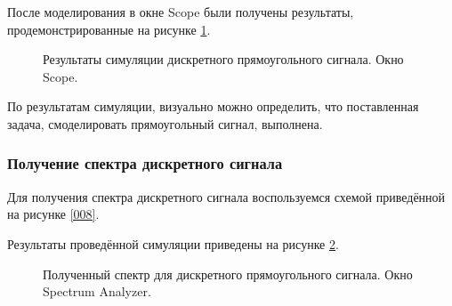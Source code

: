 \documentclass[a4paper,14pt]{extarticle}
\begin{document}
После моделирования в окне Scope были получены результаты, продемонстрированные на рисунке \ref{010}.

\begin{figure}[H]
\caption{Результаты симуляции дискретного прямоугольного сигнала. Окно Scope.}
\label{010}
\end{figure}

По результатам симуляции, визуально можно определить, что поставленная задача, смоделировать прямоугольный сигнал, выполнена.

\subsubsection{Получение спектра дискретного сигнала}

Для получения спектра дискретного сигнала воспользуемся схемой приведённой на рисунке \ref{008}.

Результаты проведённой симуляции приведены на рисунке \ref{011}.

\begin{figure}[H]
\caption{Полученный спектр для дискретного прямоугольного сигнала. Окно Spectrum Analyzer.}
\label{011}
\end{figure}
\end{document}
